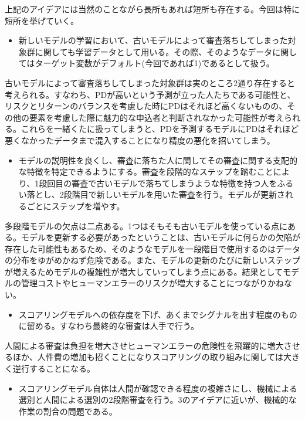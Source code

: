 \documentclass[11pt]{jsarticle}
\providecommand{\tightlist}{%
      \setlength{\itemsep}{0pt}\setlength{\parskip}{0pt}}
\begin{document}
    上記のアイデアには当然のことながら長所もあれば短所も存在する。今回は特に短所を挙げていく。

\begin{itemize}
\tightlist
\item
  新しいモデルの学習において、古いモデルによって審査落ちしてしまった対象群に関しても学習データとして用いる。その際、そのようなデータに関してはターゲット変数がデフォルト(今回であれば1)であるとして扱う。
\end{itemize}

古いモデルによって審査落ちしてしまった対象群は実のところ2通り存在すると考えられる。すなわち、PDが高いという予測が立った人たちである可能性と、リスクとリターンのバランスを考慮した時にPDはそれほど高くないものの、その他の要素を考慮した際に魅力的な申込者と判断されなかった可能性が考えられる。これらを一緒くたに扱ってしまうと、PDを予測するモデルにPDはそれほど悪くなかったデータまで混入することになり精度の悪化を招いてしまう。

\begin{itemize}
\tightlist
\item
  モデルの説明性を良くし、審査に落ちた人に関してその審査に関する支配的な特徴を特定できるようにする。審査を段階的なステップを踏むことにより、1段回目の審査で古いモデルで落ちてしまうような特徴を持つ人をふるい落とし、2段階目で新しいモデルを用いた審査を行う。モデルが更新されるごとにステップを増やす。
\end{itemize}

多段階モデルの欠点は二点ある。1つはそもそも古いモデルを使っている点にある。モデルを更新する必要があったということは、古いモデルに何らかの欠陥が存在した可能性もあるため、そのようなモデルを一段階目で使用するのはデータの分布をゆがめかねず危険である。また、モデルの更新のたびに新しいステップが増えるためモデルの複雑性が増大していってしまう点にある。結果としてモデルの管理コストやヒューマンエラーのリスクが増大することにつながりかねない。

\begin{itemize}
\tightlist
\item
  スコアリングモデルへの依存度を下げ、あくまでシグナルを出す程度のものに留める。すなわち最終的な審査は人手で行う。
\end{itemize}

人間による審査は負担を増大させヒューマンエラーの危険性を飛躍的に増大させるほか、人件費の増加も招くことになりスコアリングの取り組みに関しては大きく逆行することになる。

\begin{itemize}
\tightlist
\item
  スコアリングモデル自体は人間が確認できる程度の複雑さにし、機械による選別と人間による選別の2段階審査を行う。3のアイデアに近いが、機械的な作業の割合の問題である。
\end{itemize}
\end{document}
